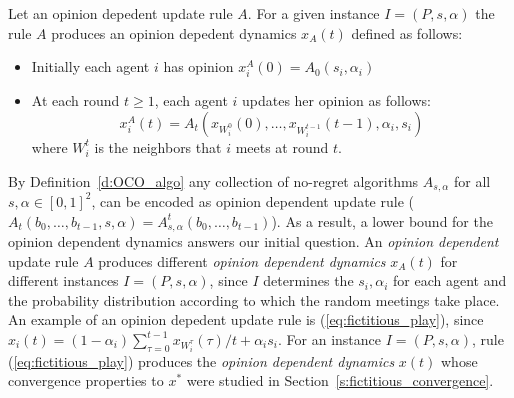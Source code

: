 \begin{definition}\label{d:opinion_dependent_dynamics}
Let an opinion depedent update rule $A$. For a given instance $I=(P,s,\alpha)$
the rule $A$ produces an opinion depedent dynamics $x_A(t)$ defined as follows:
\begin{itemize}
 \item Initially each agent $i$ has opinion $x_i^A(0)=A_0(s_i,\alpha_i)$
 \item At each round $t\geq 1$, each agent $i$ updates her opinion as follows:
 \[x_i^A(t)=A_t(x_{W_i^0}(0),\dots,x_{W_i^{t-1}}(t-1),\alpha_i,s_i)\]
where $W_i^t$ is the neighbors that $i$ meets at round $t$.
\end{itemize}
\end{definition}
By Definition~\ref{d:OCO_algo} any collection of no-regret algorithms
$A_{s,\alpha}$ for all $s,\alpha \in [0,1]^2$, can be encoded as opinion dependent
update rule ($A_t(b_0,\ldots,b_{t-1},s,\alpha)=A_{s,\alpha}^t(b_0,\dots,b_{t-1})$).
As a result, a lower bound for the opinion dependent dynamics 
answers our initial question. An \emph{opinion dependent} update rule $A$
produces different \emph{opinion dependent dynamics} $x_A(t)$
for different instances $I=(P,s,\alpha)$, since $I$ determines
the $s_i,\alpha_i$ for each agent and the probability distribution
according to which the random meetings take place. 
An example of an opinion depedent update rule is
(\ref{eq:fictitious_play}), since $x_i(t) = (1-\alpha_i)\sum_{\tau=0}^{t-1}x_{W_i^\tau}(\tau)/t 
+ \alpha_is_i$. For an instance $I=(P,s,\alpha)$, rule (\ref{eq:fictitious_play}) produces the 
\emph{opinion dependent dynamics} $x(t)$ whose convergence properties 
to $x^*$ were studied in Section~\ref{s:fictitious_convergence}. 



